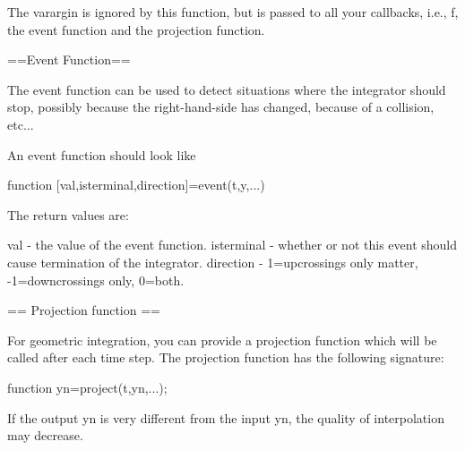 The varargin is ignored by this function, but is passed to all your callbacks, i.e.,
 f, the event function and the projection function.

 ==Event Function==

 The event function can be used to detect situations where the integrator should stop,
 possibly because the right-hand-side has changed, because of a collision, etc...

 An event function should look like

    function [val,isterminal,direction]=event(t,y,...)

 The return values are:

 val        - the value of the event function.
 isterminal - whether or not this event should cause termination of the integrator.
 direction  - 1=upcrossings only matter, -1=downcrossings only, 0=both.

 == Projection function ==

 For geometric integration, you can provide a projection function which will be
 called after each time step. The projection function has the following signature:

     function yn=project(t,yn,...);

 If the output yn is very different from the input yn, the quality of interpolation
 may decrease.
